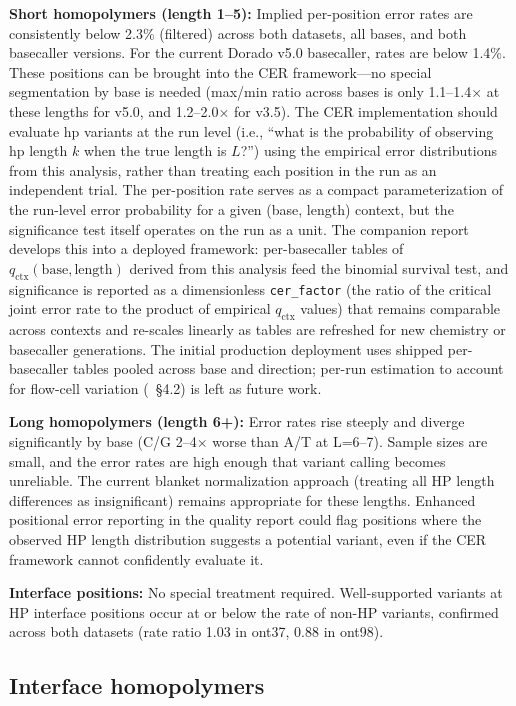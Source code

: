 \documentclass[11pt]{article}
\begin{document}
\textbf{Short homopolymers (length 1--5):} Implied per-position error rates
are consistently below 2.3\% (filtered) across both datasets, all bases, and
both basecaller versions. For the current Dorado v5.0 basecaller, rates are
below 1.4\%. These positions can be brought into the CER framework---no
special segmentation by base is needed (max/min ratio across bases is only
1.1--1.4$\times$ at these lengths for v5.0, and 1.2--2.0$\times$ for v3.5).
The CER implementation should evaluate hp variants at the run level (i.e.,
``what is the probability of observing hp length $k$ when the true length is
$L$?'') using the empirical error distributions from this analysis, rather than
treating each position in the run as an independent trial. The per-position
rate serves as a compact parameterization of the run-level error probability
for a given (base, length) context, but the significance test itself operates
on the run as a unit. The companion report~\cite{cer_practice} develops this
into a deployed framework: per-basecaller tables of $q_\text{ctx}(\text{base},
\text{length})$ derived from this analysis feed the binomial survival test, and
significance is reported as a dimensionless \texttt{cer\_factor} (the
ratio of the critical joint error rate to the product of empirical $q_\text{ctx}$
values) that remains comparable across contexts and re-scales linearly as tables
are refreshed for new chemistry or basecaller generations. The initial production
deployment uses shipped per-basecaller tables pooled across base and direction;
per-run estimation to account for flow-cell variation
(\cite{cer_practice}~\S 4.2) is left as future work.

\textbf{Long homopolymers (length 6+):} Error rates rise steeply and diverge
significantly by base (C/G 2--4$\times$ worse than A/T at L=6--7). Sample
sizes are small, and the error rates are high enough that variant calling
becomes unreliable. The current blanket normalization approach (treating all HP
length differences as insignificant) remains appropriate for these lengths.
Enhanced positional error reporting in the quality report could flag positions
where the observed HP length distribution suggests a potential variant, even if
the CER framework cannot confidently evaluate it.

\textbf{Interface positions:} No special treatment required. Well-supported
variants at HP interface positions occur at or below the rate of non-HP
variants, confirmed across both datasets (rate ratio 1.03 in ont37, 0.88
in ont98).

\subsection{Interface homopolymers}
\end{document}
